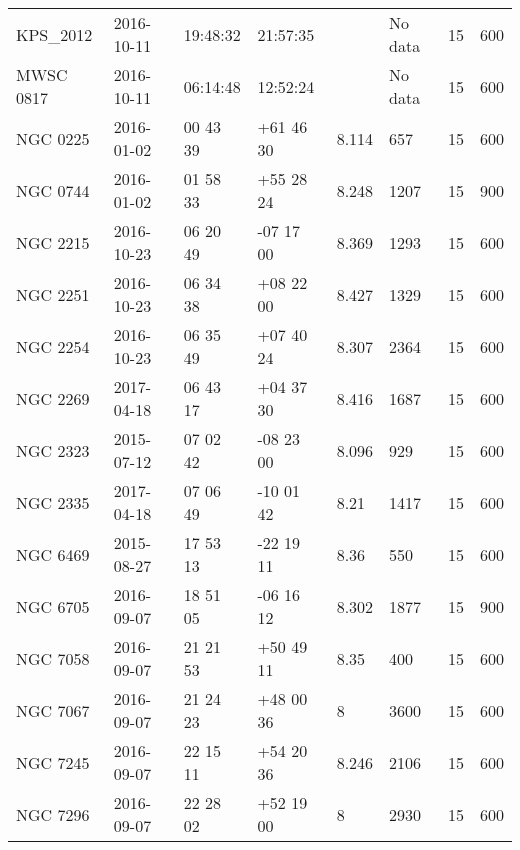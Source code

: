 \documentclass{jaa}
\begin{document}
\begin{table*}
\begin{tabular}{llllllll}
KPS\_2012        & 2016-10-11          & 19:48:32      & 21:57:35       &         & No data         & 15          & 600           \\
MWSC 0817        & 2016-10-11          & 06:14:48      & 12:52:24       &         & No data         & 15          & 600           \\
NGC 0225        & 2016-01-02          & 00 43 39      & +61 46 30      & 8.114      & 657           & 15          & 600           \\
NGC 0744        & 2016-01-02          & 01 58 33      & +55 28 24      & 8.248      & 1207          & 15          & 900           \\
NGC 2215        & 2016-10-23          & 06 20 49      & -07 17 00      & 8.369      & 1293          & 15          & 600           \\
NGC 2251        & 2016-10-23          & 06 34 38      & +08 22 00      & 8.427      & 1329          & 15          & 600           \\
NGC 2254        & 2016-10-23          & 06 35 49      & +07 40 24      & 8.307      & 2364          & 15          & 600           \\
NGC 2269        & 2017-04-18          & 06 43 17      & +04 37 30      & 8.416      & 1687          & 15          & 600           \\
NGC 2323        & 2015-07-12          & 07 02 42      & -08 23 00      & 8.096      & 929           & 15          & 600           \\
NGC 2335        & 2017-04-18          & 07 06 49      & -10 01 42      & 8.21       & 1417          & 15          & 600           \\
NGC 6469        & 2015-08-27          & 17 53 13      & -22 19 11      & 8.36       & 550           & 15          & 600           \\
NGC 6705        & 2016-09-07          & 18 51 05      & -06 16 12      & 8.302      & 1877          & 15          & 900           \\
NGC 7058        & 2016-09-07          & 21 21 53      & +50 49 11      & 8.35       & 400           & 15          & 600           \\
NGC 7067        & 2016-09-07          & 21 24 23      & +48 00 36      & 8        & 3600          & 15          & 600           \\
NGC 7245        & 2016-09-07          & 22 15 11      & +54 20 36      & 8.246      & 2106          & 15          & 600           \\
NGC 7296        & 2016-09-07          & 22 28 02      & +52 19 00      & 8        & 2930          & 15          & 600           \\

\end{tabular}
\end{table*}
\end{document}
